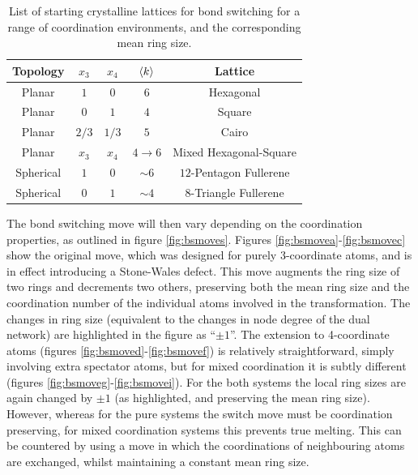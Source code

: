 \begin{table}
   \centering
     \caption{List of starting crystalline lattices for bond switching for a range of coordination environments, and the corresponding mean ring size.}
     \label{tab:lattices}
     \begin{tabular}{ccccc}
     \toprule
     Topology & $x_3$ & $x_4$ & $\langle k \rangle$ & Lattice\\
     \midrule
        Planar & $1$ & $0$ & $6$ & Hexagonal \\
        Planar & $0$ & $1$ & $4$ & Square \\
        Planar & $2/3$ & $1/3$ & $5$ & Cairo \\
        Planar & $x_3$ & $x_4$ & $4\rightarrow6$ & Mixed Hexagonal\--Square \\
        Spherical & $1$ & $0$ & $\sim 6$ & $12$-Pentagon Fullerene \\
        Spherical & $0$ & $1$ & $\sim 4$ & $8$-Triangle Fullerene \\
        \bottomrule
     \end{tabular}
\end{table}

The bond switching move will then vary depending on the coordination properties, as outlined in figure \ref{fig:bsmoves}.
Figures \ref{fig:bsmovea}\--\ref{fig:bsmovec} show the original move, which was designed for purely 3\--coordinate atoms, and is in effect introducing a Stone\--Wales defect.
This move augments the ring size of two rings and decrements two others, preserving both the mean ring size and the coordination number of the individual atoms involved in the transformation.
The changes in ring size (equivalent to the changes in node degree of the dual network) are highlighted in the figure as ``$\pm{1}$''.
The extension to 4\--coordinate atoms (figures \ref{fig:bsmoved}\--\ref{fig:bsmovef}) is relatively straightforward, simply involving extra spectator atoms, but for mixed coordination it is subtly different (figures \ref{fig:bsmoveg}\--\ref{fig:bsmovei}).
For the both systems the local ring sizes are again changed by $\pm{1}$ (as highlighted, and preserving the mean ring size).
However, whereas for the pure systems the switch move must be coordination preserving, for mixed coordination systems this prevents true melting.
This can be countered by using a move in which the coordinations of neighbouring atoms are exchanged, whilst maintaining a constant mean ring size.

